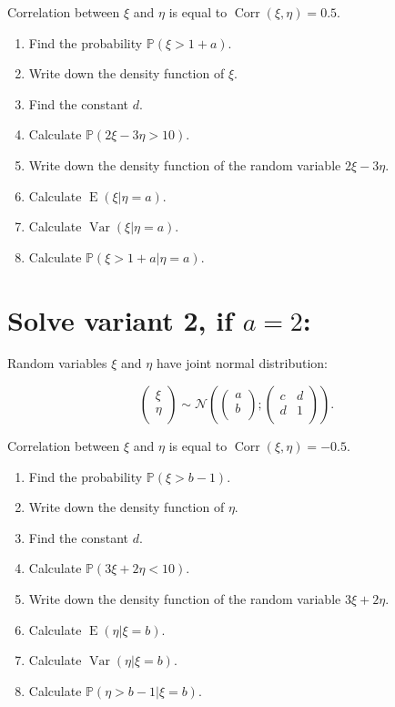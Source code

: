 \documentclass[12pt]{article}
\DeclareMathOperator{\Corr}{Corr}
\DeclareMathOperator{\Var}{Var}
\DeclareMathOperator{\E}{E}
\def \cN{\mathcal{N}}
\def \P{\mathbb{P}}
\begin{document}
Correlation between $\xi$ and $\eta$ is equal to $\Corr(\xi, \eta)= 0.5$.


\begin{enumerate}
\item Find the probability $\P(\xi > 1 + a)$.
\item Write down the density function of $\xi$.
\item Find the constant $d$. 
\item Calculate $\P(2\xi -3\eta >10)$.
\item Write down the density function of the random variable $2\xi -3\eta$.
\item Calculate $\E(\xi |\eta = a)$.
\item Calculate $\Var(\xi |\eta = a)$.
\item Calculate $\P(\xi > 1+ a |\eta = a)$.
\end{enumerate}

\section*{Solve variant 2, if $a=2$:}

Random variables $\xi$ and $\eta$ have joint normal distribution:

\[
\begin{pmatrix}
  \xi \\
  \eta \\
\end{pmatrix}   \sim 
\cN \left(
\begin{pmatrix}
a \\
b \\
\end{pmatrix};
\begin{pmatrix}
  c & d \\
  d & 1 \\
\end{pmatrix}
\right).
\]

Correlation between $\xi$ and $\eta$ is equal to $\Corr(\xi, \eta)= -0.5$.


\begin{enumerate}
\item Find the probability $\P(\xi > b - 1)$.
\item Write down the density function of $\eta$.
\item Find the constant $d$. 
\item Calculate $\P(3\xi +2 \eta <10)$.
\item Write down the density function of the random variable  $3\xi +2\eta$.
\item Calculate $\E(\eta |\xi = b)$.
\item Calculate $\Var(\eta |\xi = b)$.
\item Calculate $\P(\eta > b- 1 |\xi = b)$.
\end{enumerate}
\end{document}
